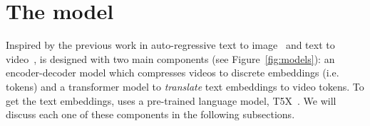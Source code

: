 \section{The \phenaki model}
\label{sec:method}
Inspired by the previous work in auto-regressive text to image~\cite{DALLE,PARTI,saharia2022photorealistic} and text to video~\cite{nuwa,wu2022nuwa,cogvideo}, \model is designed with two main components (see Figure~\ref{fig:models}): an encoder-decoder model which compresses videos to discrete embeddings (i.e. tokens) and a transformer model to \textit{translate} text embeddings to video tokens. To get the text embeddings, \model uses a pre-trained language model, T5X~\cite{roberts2022scaling}. We will discuss each one of these components in the following subsections.
 

